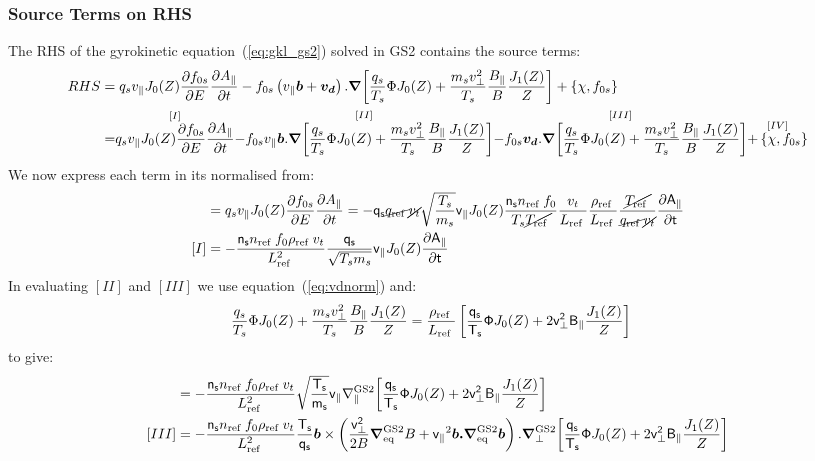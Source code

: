 \documentclass[10pt,a4paper]{article}
\newcommand{\grad}{{\bfm \nabla}}
\newcommand{\pd}[2]{\frac{\partial{#1}}{\partial{#2}} }
\newcommand{\bfm}[1]{\mbox{{\boldmath $ { #1}$}}}
\newcommand{\ggp}{\nabla_{\parallel}^{\rm GS2}}
\newcommand{\gradeq}{\bfm{\nabla}^{\rm GS2}_{\rm eq}}
\newcommand{\gperp}{\bfm{\nabla}^{\rm GS2}_{\perp}}
\newcommand{\n}[1]{{#1}_{\rm ref\;}}
\newcommand{\g}[1]{\mathsf{#1}}
\begin{document}
\subsubsection*{Source Terms on RHS}
The RHS of the gyrokinetic equation~(\ref{eq:gkl_gs2}) solved in GS2 contains
the source terms:
\begin{align*}
  RHS & = {q_s v_{\parallel} J_0(Z) \pd{f_{0s}}{E} \pd{A_{\parallel}}{t}} -
  f_{0s} \left( v_{\parallel} \bfm{b} + \bfm{v_d} \right). \grad{ \left[
      \frac{q_s}{T_s} \Phi J_0(Z) + \frac{m_s v_{\perp}^2}{T_s}
      \frac{B_{\parallel}}{B} \frac{J_1(Z)}{Z} \right]} +
  \left\{ \chi, f_{0s}\right\} \\
  & = \stackrel{[I]}{q_s v_{\parallel} J_0(Z) \pd{f_{0s}}{E}
    \pd{A_{\parallel}}{t}} \stackrel{[II]}{-f_{0s} v_{\parallel} \bfm{b}
    . \grad{ \left[ \frac{q_s}{T_s} \Phi J_0(Z) + \frac{m_s v_{\perp}^2}{T_s}
        \frac{B_{\parallel}}{B} \frac{J_1(Z)}{Z} \right] }}
  \stackrel{[III]}{-f_{0s} \bfm{v_d} . \grad{ \left[ \frac{q_s}{T_s} \Phi
        J_0(Z) + \frac{m_s v_{\perp}^2}{T_s} \frac{B_{\parallel}}{B}
        \frac{J_1(Z)}{Z} \right]}} \stackrel{[IV]}{+ \left\{ \chi,
      f_{0s}\right\}}
\end{align*}
We now express each term in its normalised from:
\begin{align*}
  [I] & = q_s v_{\parallel} J_0(Z) \pd{f_{0s}}{E} \pd{A_{\parallel}}{t} =
  -\g{q_s} \cancel{\n{q}} \cancel{v_t} \sqrt{\frac{T_s}{m_s}}
  \g{v_{\parallel}} J_0(Z) \frac{\g{n_s} \n{n} f_0}{T_s \cancel{\n{T}}}
  \frac{v_t}{\n{L}} \frac{\n{\rho}}{\n{L}}
  \frac{\cancel{\n{T}}}{\cancel{\n{q}}\cancel{v_t}}
  \pd{\g{A_{\parallel}}}{\g{t}} \\
  [I] & = - \frac{\g{n_s} \n{n} f_0 \n{\rho} v_t}{\n{L}^2}
  \frac{\g{q_s}}{\sqrt{T_s m_s}} \g{v_{\parallel}} J_0(Z)
  \pd{\g{A_{\parallel}}}{\g{t}}
\end{align*}
In evaluating $[II]$ and $[III]$ we use equation~(\ref{eq:vdnorm}) and:
\begin{align*}
  \frac{q_s}{T_s} \Phi J_0(Z) + \frac{m_s v_{\perp}^2}{T_s}
  \frac{B_{\parallel}}{B} \frac{J_1(Z)}{Z} & = \frac{\n{\rho}}{\n{L}} \left[
    \frac{\g{q_s}}{\g{T_s}} \g{\Phi} J_0(Z) + 2 \g{v_{\perp}^2}
    \g{B_{\parallel}} \frac{J_1(Z)}{Z} \right]
\end{align*}
to give:
\begin{align*}
  [II] & = -\frac{\g{n_s} \n{n} f_0 \n{\rho} v_t }{\n{L}^2}
  \sqrt{\frac{\g{T_s}}{\g{m_s}}} \g{v_{\parallel}} \ggp{\left[
      \frac{\g{q_s}}{\g{T_s}} \g{\Phi} J_0(Z) + 2 \g{v_{\perp}^2}
      \g{B_{\parallel}} \frac{J_1(Z)}{Z} \right]} \\
  [III] & = -\frac{\g{n_s} \n{n} f_0 \n{\rho} v_t}{\n{L}^2}
  \frac{\g{T_s}}{\g{q_s}} \bfm{b} \times \left( \frac{\g{v_{\perp}^2}}{2B}
    \gradeq{B} + \g{v_{\parallel}}^2 \bfm{b.}\gradeq \bfm{b} \right).\gperp {
    \left[ \frac{\g{q_s}}{\g{T_s}} \g{\Phi} J_0(Z) + 2 \g{v_{\perp}^2}
      \g{B_{\parallel}} \frac{J_1(Z)}{Z} \right]}
\end{align*}
\end{document}

